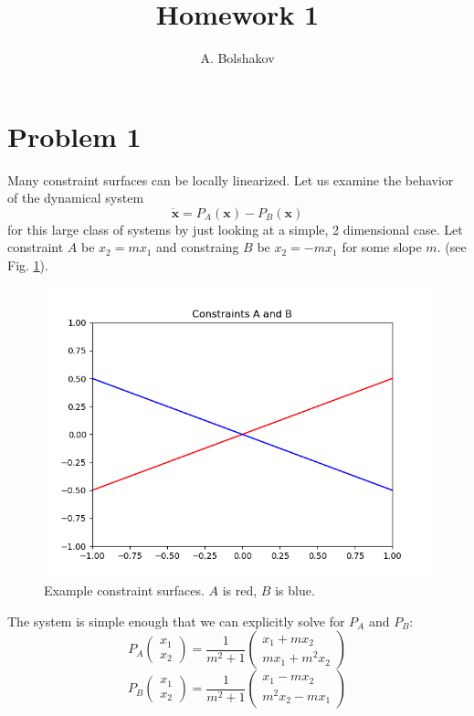 \documentclass[psamsfonts]{amsart}
\title{Homework 1}
\author{A. Bolshakov}
\theoremstyle{definition}
\theoremstyle{remark}
\numberwithin{equation}{section}
\begin{document}
\maketitle

\section{Problem 1}

Many constraint surfaces can be locally linearized. 
Let us examine the behavior of the dynamical system
\[
\dot{\mathbf{x}} = P_A(\mathbf{x}) - P_B(\mathbf{x})
\]
for this large class of systems by just looking at a simple, 2 dimensional case. 
Let constraint $A$ be
$x_2 = mx_1$
and constraing $B$ be 
$x_2 = -mx_1$
for some slope $m$.
(see Fig. \ref{fig1}).




\begin{figure}
\includegraphics[scale=0.5]{Figure_1.png}
\caption{Example constraint surfaces. $A$ is red, $B$ is blue.}
\label{fig1}
\end{figure}



The system is simple enough that we can explicitly solve for $P_A$ and $P_B$:
\[
P_A \left( 
\begin{matrix}
x_1 \\ x_2
\end{matrix}
\right)
= 
\frac{1}{m^2 + 1}
\left(
\begin{matrix}
x_1 + mx_2 \\
mx_1 + m^2x_2
\end{matrix}
\right)
\]
\[
P_B \left( 
\begin{matrix}
x_1 \\ x_2
\end{matrix}
\right)
= 
\frac{1}{m^2 + 1}
\left(
\begin{matrix}
x_1 - mx_2 \\
m^2x_2 - mx_1
\end{matrix}
\right)
\]
\end{document}
